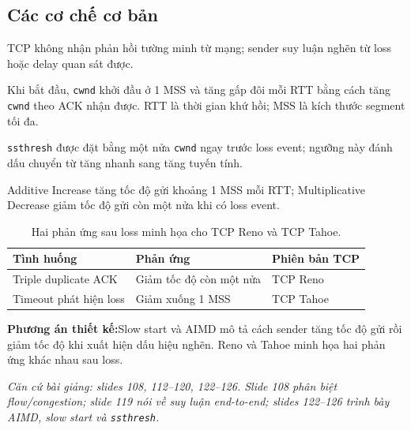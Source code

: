 \documentclass[11pt,a4paper]{article}
\newcommand{\sourcenote}[1]{\par{\small\color{muted}\textit{Căn cứ bài giảng: #1}}\par}
\newcommand{\proposallabel}{\textbf{\color{navy}Phương án thiết kế:}\enspace}
\begin{document}
\subsection{Các cơ chế cơ bản}
\begin{description}[style=nextline,leftmargin=2.6cm]
  \item[End-to-end] TCP không nhận phản hồi tường minh từ mạng; sender suy luận nghẽn từ loss hoặc delay quan sát được.
  \item[Slow start] Khi bắt đầu, \texttt{cwnd} khởi đầu ở 1 MSS và tăng gấp đôi mỗi RTT bằng cách tăng \texttt{cwnd} theo ACK nhận được. RTT là thời gian khứ hồi; MSS là kích thước segment tối đa.
  \item[Ngưỡng] \texttt{ssthresh} được đặt bằng một nửa \texttt{cwnd} ngay trước loss event; ngưỡng này đánh dấu chuyển từ tăng nhanh sang tăng tuyến tính.
  \item[AIMD] Additive Increase tăng tốc độ gửi khoảng 1 MSS mỗi RTT; Multiplicative Decrease giảm tốc độ gửi còn một nửa khi có loss event.
\end{description}
\begin{table}[H]
\centering
\small
\begin{tabularx}{\linewidth}{@{}P{3.3cm}Y Y@{}}
\toprule
\textbf{Tình huống} & \textbf{Phản ứng} & \textbf{Phiên bản TCP} \\
\midrule
Triple duplicate ACK & Giảm tốc độ còn một nửa & TCP Reno \\
Timeout phát hiện loss & Giảm xuống 1 MSS & TCP Tahoe \\
\bottomrule
\end{tabularx}
\caption{Hai phản ứng sau loss minh họa cho TCP Reno và TCP Tahoe.}
\label{tab:tcp-variants}
\end{table}
\proposallabel Slow start và AIMD mô tả cách sender tăng tốc độ gửi rồi giảm tốc độ khi xuất hiện dấu hiệu nghẽn. Reno và Tahoe minh họa hai phản ứng khác nhau sau loss.
\sourcenote{slides 108, 112--120, 122--126. Slide 108 phân biệt flow/congestion; slide 119 nói về suy luận end-to-end; slides 122--126 trình bày AIMD, slow start và \texttt{ssthresh}.}

\clearpage
\end{document}
